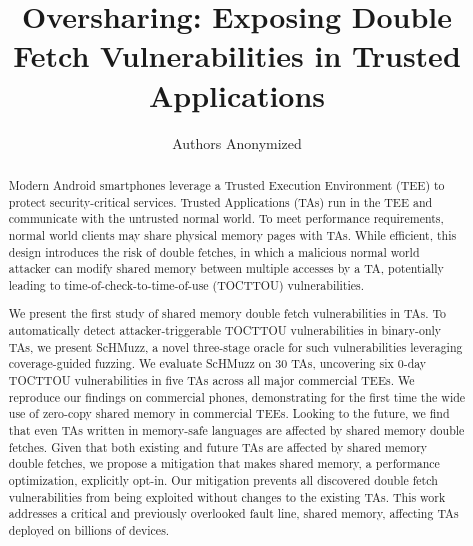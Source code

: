 \documentclass[letterpaper,twocolumn,10pt]{article}
\newcommand{\sysname}{ScHMuzz\xspace}
\newcommand{\numTAsharnessed}{30\xspace}
\newcommand{\numvulns}{six\xspace}
\newcommand{\numvulnTAs}{five\xspace}
\begin{document}

\date{}

\title{\Large \bf Oversharing: Exposing Double Fetch Vulnerabilities in Trusted Applications} 

\author
{Authors Anonymized
} %


\maketitle

\begin{abstract}

Modern Android smartphones leverage a Trusted Execution Environment (TEE) to 
protect security-critical services. Trusted Applications (TAs) run in the TEE and 
communicate with the untrusted normal world.
To meet performance requirements, normal world clients may share physical memory pages with 
TAs. While efficient, this design introduces the risk of double fetches, 
in which a malicious normal world attacker can modify shared memory between multiple accesses 
by a TA, potentially leading to time-of-check-to-time-of-use (TOCTTOU) vulnerabilities.

We present the first study of shared memory double fetch vulnerabilities in TAs. 
To automatically detect attacker-triggerable TOCTTOU  
vulnerabilities in binary-only TAs, we present \sysname, a novel three-stage oracle for such vulnerabilities 
leveraging coverage-guided fuzzing.
We evaluate \sysname on \numTAsharnessed{} TAs, uncovering \numvulns{} 
0-day TOCTTOU vulnerabilities in \numvulnTAs{} TAs across all major commercial TEEs. We reproduce 
our findings on commercial phones, demonstrating for the first time the wide use of zero-copy 
shared memory in commercial TEEs. Looking to the future, we find that even TAs 
written in memory-safe languages are affected by shared memory double fetches. 
Given that both existing and future TAs are affected by shared memory double fetches, we 
propose a mitigation that makes shared memory, a performance optimization, explicitly opt-in. Our mitigation 
prevents all discovered double fetch vulnerabilities from being exploited without 
changes to the existing TAs. 
This work addresses a critical and previously overlooked fault line, shared memory, 
affecting TAs deployed on billions of devices.

\end{abstract}
\end{document}
